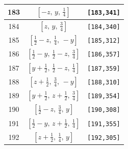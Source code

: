 \documentclass[fleqn,8pt]{jsarticle}
\begin{document}
\begin{longtable}{ccc}
183 & $\left[ - z,\, y,\, \frac{1}{4} \right]$ & {\tt [183,341]} \\ \hline
184 & $\left[ z,\, y,\, \frac{3}{4} \right]$ & {\tt [184,340]} \\ \hline
185 & $\left[ \frac{1}{2} - z,\, \frac{1}{4},\, - y \right]$ & {\tt [185,312]} \\ \hline
186 & $\left[ \frac{1}{2} - y,\, \frac{1}{2} - z,\, \frac{3}{4} \right]$ & {\tt [186,357]} \\ \hline
187 & $\left[ y + \frac{1}{2},\, \frac{1}{2} - z,\, \frac{1}{4} \right]$ & {\tt [187,359]} \\ \hline
188 & $\left[ z + \frac{1}{2},\, \frac{3}{4},\, - y \right]$ & {\tt [188,310]} \\ \hline
189 & $\left[ y + \frac{1}{2},\, z + \frac{1}{2},\, \frac{3}{4} \right]$ & {\tt [189,354]} \\ \hline
190 & $\left[ \frac{1}{2} - z,\, \frac{3}{4},\, y \right]$ & {\tt [190,308]} \\ \hline
191 & $\left[ \frac{1}{2} - y,\, z + \frac{1}{2},\, \frac{1}{4} \right]$ & {\tt [191,355]} \\ \hline
192 & $\left[ z + \frac{1}{2},\, \frac{1}{4},\, y \right]$ & {\tt [192,305]} \\
\end{longtable}
\renewcommand{\arraystretch}{1.2}
\end{document}
